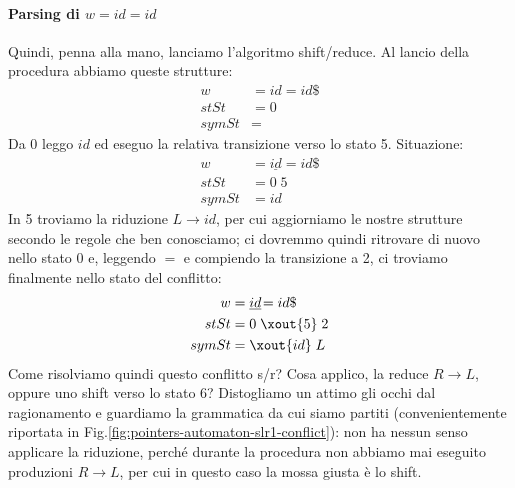 \documentclass[class=book, crop=false, oneside, 12pt]{standalone}
\begin{document}
\paragraph{Parsing di \(w = id\!=\!id\)}
Quindi, penna alla mano, lanciamo l'algoritmo shift/reduce. Al lancio della procedura abbiamo queste strutture:
\begin{align*}
    w &= id\!=\!id\$ \\
    stSt &= 0 \\
    symSt &= 
\end{align*}
Da 0 leggo \(id\) ed eseguo la relativa transizione verso lo stato 5. Situazione:
\begin{align*}
    w &= \underline{id}\!=\!id\$ \\
    stSt &= 0\;5 \\
    symSt &= id
\end{align*}
In 5 troviamo la riduzione \(L \to id\), per cui aggiorniamo le nostre strutture secondo le regole che ben conosciamo; ci dovremmo quindi ritrovare di nuovo nello stato 0 e, leggendo \(=\) e compiendo la transizione a 2, ci troviamo finalmente nello stato del conflitto:
\begin{align*}
    w &= \underline{id}\!=id\$ \\
    stSt &= 0\;\xout{5}\;2\\
    symSt &= \xout{id}\;L 
\end{align*}
Come risolviamo quindi questo conflitto s/r? Cosa applico, la reduce \(R \to L\), oppure uno shift verso lo stato 6? Distogliamo un attimo gli occhi dal ragionamento e guardiamo la grammatica da cui siamo partiti (convenientemente riportata in Fig.\ref{fig:pointers-automaton-slr1-conflict}): non ha nessun senso applicare la riduzione, perché durante la procedura non abbiamo mai eseguito produzioni \(R \to L\), per cui in questo caso la mossa giusta è lo shift.
\end{document}
